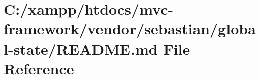 \hypertarget{vendor_2sebastian_2global-state_2_r_e_a_d_m_e_8md}{}\section{C\+:/xampp/htdocs/mvc-\/framework/vendor/sebastian/global-\/state/\+R\+E\+A\+D\+ME.md File Reference}
\label{vendor_2sebastian_2global-state_2_r_e_a_d_m_e_8md}
